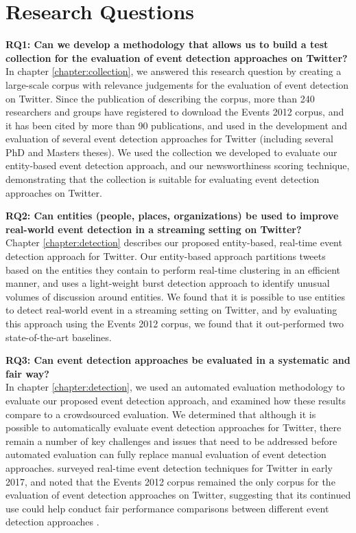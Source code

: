 \section{Research Questions}
\textbf{RQ1: Can we develop a methodology that allows us to build a test collection for the evaluation of event detection approaches on Twitter?}\\
In chapter \ref{chapter:collection}, we answered this research question by creating a large-scale corpus with relevance judgements for the evaluation of event detection on Twitter.
Since the publication of \cite{McMinn2013} describing the corpus, more than 240 researchers and groups have registered to download the Events 2012 corpus, and it has been cited by more than 90 publications, and used in the development and evaluation of several event detection approaches for Twitter (including several PhD and Masters theses).
We used the collection we developed to evaluate our entity-based event detection approach, and our newsworthiness scoring technique, demonstrating that the collection is suitable for evaluating event detection approaches on Twitter.

\textbf{RQ2: Can entities (people, places, organizations) be used to improve real-world event detection in a streaming setting on Twitter?} \\
Chapter \ref{chapter:detection} describes our proposed entity-based, real-time event detection approach for Twitter.
Our entity-based approach partitions tweets based on the entities they contain to perform real-time clustering in an efficient manner, and uses a light-weight burst detection approach to identify unusual volumes of discussion around entities.
We found that it is possible to use entities to detect real-world event in a streaming setting on Twitter, and by evaluating this approach using the Events 2012 corpus, we found that it out-performed two state-of-the-art baselines.

\textbf{RQ3: Can event detection approaches be evaluated in a systematic and fair way?} \\
In chapter \ref{chapter:detection}, we used an automated evaluation methodology to evaluate our proposed event detection approach, and examined how these results compare to a crowdsourced evaluation.
We determined that although it is possible to automatically evaluate event detection approaches for Twitter, there remain a number of key challenges and issues that need to be addressed before automated evaluation can fully replace manual evaluation of event detection approaches.
\cite{Hasan17} surveyed real-time event detection techniques for Twitter in early 2017, and noted that the Events 2012 corpus remained the only corpus for the evaluation of event detection approaches on Twitter, suggesting that its continued use could help conduct fair performance comparisons between different event detection approaches \citep{Hasan17}.

